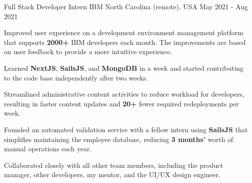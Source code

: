 \begin{cventries}
    \cventry
    {Full Stack Developer Intern} %
    {IBM} %
    {North Carolina (remote), USA} %
    {May 2021 - Aug 2021} %
    {
      \begin{cvitems} %
        \item {Improved user experience on a development environment management platform that supports \textbf{2000+} IBM developers each month. The improvements are based on user feedback to provide a more intuitive experience.}
      \item {Learned \textbf{NextJS}, \textbf{SailsJS}, and \textbf{MongoDB} in a week and started contributing to the code base independently after two weeks.}
        \item {Streamlined administrative content activities to reduce workload for developers, resulting in faster content updates and \textbf{20+} fewer required redeployments per week.}
        \item {Founded an automated validation service with a fellow intern using \textbf{SailsJS} that simplifies maintaining the employee database, reducing \textbf{3 months'} worth of manual operations each year.}
        \item {Collaborated closely with all other team members, including the product manager, other developers, my mentor, and the UI/UX design engineer.}
      \end{cvitems}
    }



\end{cventries}
